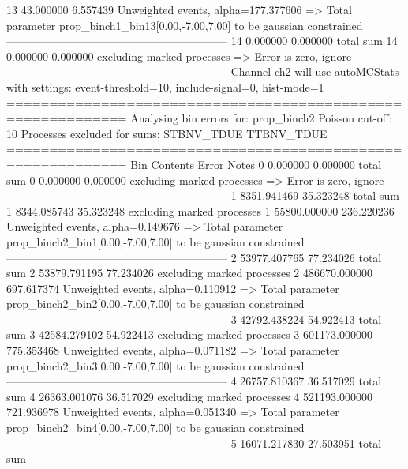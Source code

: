13         43.000000       6.557439        Unweighted events, alpha=177.377606
  => Total parameter prop_binch1_bin13[0.00,-7.00,7.00] to be gaussian constrained
------------------------------------------------------------
14         0.000000        0.000000        total sum                     
14         0.000000        0.000000        excluding marked processes    
  => Error is zero, ignore      
------------------------------------------------------------
Channel ch2 will use autoMCStats with settings: event-threshold=10, include-signal=0, hist-mode=1
============================================================
Analysing bin errors for: prop_binch2
Poisson cut-off: 10
Processes excluded for sums: STBNV_TDUE TTBNV_TDUE
============================================================
Bin        Contents        Error           Notes                         
0          0.000000        0.000000        total sum                     
0          0.000000        0.000000        excluding marked processes    
  => Error is zero, ignore      
------------------------------------------------------------
1          8351.941469     35.323248       total sum                     
1          8344.085743     35.323248       excluding marked processes    
1          55800.000000    236.220236      Unweighted events, alpha=0.149676
  => Total parameter prop_binch2_bin1[0.00,-7.00,7.00] to be gaussian constrained
------------------------------------------------------------
2          53977.407765    77.234026       total sum                     
2          53879.791195    77.234026       excluding marked processes    
2          486670.000000   697.617374      Unweighted events, alpha=0.110912
  => Total parameter prop_binch2_bin2[0.00,-7.00,7.00] to be gaussian constrained
------------------------------------------------------------
3          42792.438224    54.922413       total sum                     
3          42584.279102    54.922413       excluding marked processes    
3          601173.000000   775.353468      Unweighted events, alpha=0.071182
  => Total parameter prop_binch2_bin3[0.00,-7.00,7.00] to be gaussian constrained
------------------------------------------------------------
4          26757.810367    36.517029       total sum                     
4          26363.001076    36.517029       excluding marked processes    
4          521193.000000   721.936978      Unweighted events, alpha=0.051340
  => Total parameter prop_binch2_bin4[0.00,-7.00,7.00] to be gaussian constrained
------------------------------------------------------------
5          16071.217830    27.503951       total sum                     
